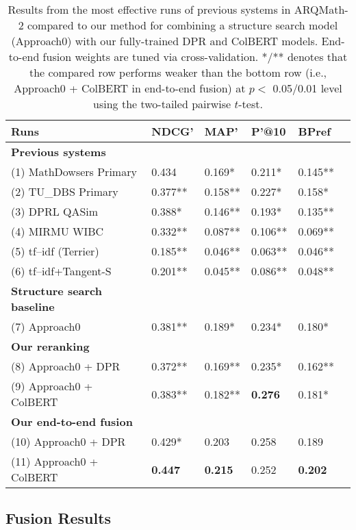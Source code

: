 \documentclass[11pt]{article}
\begin{document}
\begin{table*}
\small
\centering
\caption{\label{tab:fusion}
Results from the most effective runs of previous systems in ARQMath-2 compared to our method for combining a structure search model (Approach0) with our fully-trained DPR and ColBERT models.
End-to-end fusion weights are tuned via cross-validation.
*/** denotes that the compared row performs weaker than the bottom row (i.e., Approach0 + ColBERT in end-to-end fusion) at $p<$ 0.05/0.01
level using the two-tailed pairwise $t$-test.
}
\hspace*{-0.1in}
\begin{tabular}{l|lllll}
\toprule
    \bf Runs & NDCG' & MAP' & P'@10 & BPref \\
\midrule
\bf Previous systems &&&& \\
(1) MathDowsers Primary \citeyearpar{fraser2018tangentL,ng2020dowsing,ng2021dowsing} &0.434&0.169*&0.211*&0.145** \\
(2) TU\_DBS Primary \citeyearpar{reusch2021tu_dbs} &0.377**&0.158**&0.227*&0.158* \\
(3) DPRL QASim \citeyearpar{mansouri2021dprl} &0.388*&0.146**&0.193*&0.135** \\
(4) MIRMU WIBC \citeyearpar{novotny2021ensembling} &0.332**&0.087**&0.106**&0.069** \\
(5) tf--idf (Terrier) \citeyearpar{mansouri2021arqmath2review} &0.185**&0.046**&0.063**&0.046** \\
(6) tf--idf+Tangent-S \citeyearpar{mansouri2021arqmath2review} &0.201**&0.045**&0.086**&0.048** \\ [0.75ex]
\bf Structure search baseline  &&&& \\
(7) Approach0~\citeyearpar{zhong2019structural,zhong2020accelerating} &0.381**&0.189*&0.234*&0.180* \\[0.75ex]
\bf Our reranking &&&& \\
(8) Approach0 + DPR &0.372**&0.169**&0.235*&0.162** \\
(9) Approach0 + ColBERT &0.383**	&0.182**	&\bf 0.276	&0.181* \\[0.75ex]
\bf Our end-to-end fusion &&&& \\
(10) Approach0 + DPR &0.429*&0.203&0.258&0.189 \\
(11) Approach0 + ColBERT &\bf 0.447&\bf 0.215&0.252&\bf 0.202 \\
\bottomrule
\end{tabular}
\end{table*}

\subsection{Fusion Results}
\end{document}
